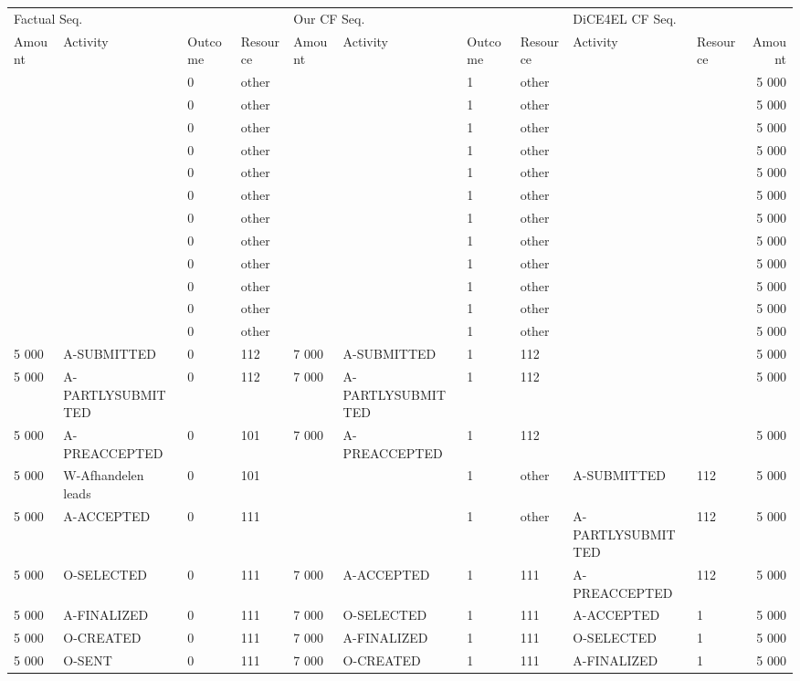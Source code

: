 \begin{tabular}{llllllllllr}
\toprule
\multicolumn{4}{l}{Factual Seq.} & \multicolumn{4}{l}{Our CF Seq.} & \multicolumn{3}{l}{DiCE4EL CF Seq.} \\
Amount & Activity & Outcome & Resource & Amount & Activity & Outcome & Resource & Activity & Resource & Amount \\
\midrule
 &  & 0 & other &  &  & 1 & other &  &  & 5 000 \\
 &  & 0 & other &  &  & 1 & other &  &  & 5 000 \\
 &  & 0 & other &  &  & 1 & other &  &  & 5 000 \\
 &  & 0 & other &  &  & 1 & other &  &  & 5 000 \\
 &  & 0 & other &  &  & 1 & other &  &  & 5 000 \\
 &  & 0 & other &  &  & 1 & other &  &  & 5 000 \\
 &  & 0 & other &  &  & 1 & other &  &  & 5 000 \\
 &  & 0 & other &  &  & 1 & other &  &  & 5 000 \\
 &  & 0 & other &  &  & 1 & other &  &  & 5 000 \\
 &  & 0 & other &  &  & 1 & other &  &  & 5 000 \\
 &  & 0 & other &  &  & 1 & other &  &  & 5 000 \\
 &  & 0 & other &  &  & 1 & other &  &  & 5 000 \\
5 000 & A-SUBMITTED & 0 & 112 & 7 000 & A-SUBMITTED & 1 & 112 &  &  & 5 000 \\
5 000 & A-PARTLYSUBMITTED & 0 & 112 & 7 000 & A-PARTLYSUBMITTED & 1 & 112 &  &  & 5 000 \\
5 000 & A-PREACCEPTED & 0 & 101 & 7 000 & A-PREACCEPTED & 1 & 112 &  &  & 5 000 \\
5 000 & W-Afhandelen leads & 0 & 101 &  &  & 1 & other & A-SUBMITTED & 112 & 5 000 \\
5 000 & A-ACCEPTED & 0 & 111 &  &  & 1 & other & A-PARTLYSUBMITTED & 112 & 5 000 \\
5 000 & O-SELECTED & 0 & 111 & 7 000 & A-ACCEPTED & 1 & 111 & A-PREACCEPTED & 112 & 5 000 \\
5 000 & A-FINALIZED & 0 & 111 & 7 000 & O-SELECTED & 1 & 111 & A-ACCEPTED & 1 & 5 000 \\
5 000 & O-CREATED & 0 & 111 & 7 000 & A-FINALIZED & 1 & 111 & O-SELECTED & 1 & 5 000 \\
5 000 & O-SENT & 0 & 111 & 7 000 & O-CREATED & 1 & 111 & A-FINALIZED & 1 & 5 000 \\

\end{tabular}

